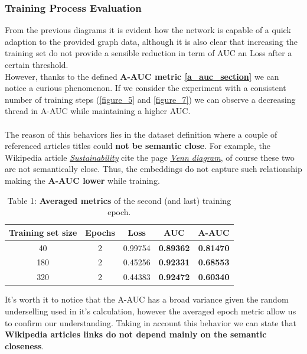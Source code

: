 \documentclass[11pt]{article}
\begin{document}
	\clearpage
	\subsubsection{Training Process Evaluation}
	From the previous diagrams it is evident how the network is capable of a quick adaption to the provided graph data, although it is also clear that increasing the training set do not provide a sensible reduction in term of AUC an Loss after a certain threshold.\\
	However, thanks to the defined \textbf{A-AUC metric \ref{a_auc_section}} we can notice a curious phenomenon. 
	If we consider the experiment with a consistent number of training steps (\ref{figure_5} and \ref{figure_7}) we can observe a decreasing thread in A-AUC while maintaining a higher AUC.\\\\
	The reason of this behaviors lies in the dataset definition where a couple of referenced articles titles could \textbf{not be semantic close}. For example, the Wikipedia article \href{https://en.wikipedia.org/wiki/Sustainability}{\textit{Sustainability}} cite the page \href{https://en.wikipedia.org/wiki/Venn_diagram}{\textit{Venn diagram}}, of course these two are not semantically close. Thus, the embeddings do not capture such relationship making the \textbf{A-AUC lower} while training.
	
	\begin{table}[h!]
		\label{table_1}
		\centering
		\begin{tabular}{ccccc}
			\toprule
			Training set size & Epochs & Loss & \textbf{AUC} & \textbf{A-AUC} \\
			\midrule
			40  & 2 & 0.99754 & \textbf{0.89362} & \textbf{0.81470} \\
			180 & 2 & 0.45256 & \textbf{0.92331} & \textbf{0.68553} \\
			320 & 2 & 0.44383 & \textbf{0.92472} & \textbf{0.60340} \\
			\bottomrule
		\end{tabular}
		\caption{Table 1: \textbf{Averaged metrics} of the second (and last) training epoch.}
	\end{table}
	
	It's worth it to notice that the A-AUC has a broad variance given the random underselling used in it's calculation, however the averaged epoch metric allow us to confirm our understanding.
	Taking in account this behavior we can state that \textbf{Wikipedia articles links do not depend mainly on the semantic closeness}. 
	
\end{document}
